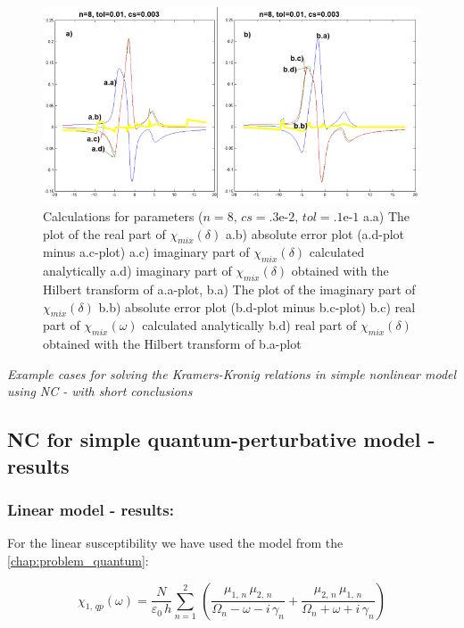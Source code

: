 \documentclass[12pt,twoside,a4paper]{article}
\numberwithin{equation}{subsection}
\numberwithin{figure}{subsection}
\begin{document}
\begin{figure} 
  \includegraphics[width=150mm]{img/nc_fmix1.png}
  \caption{Calculations for parameters ($n=8, \,cs=\mbox{.3e-2}, \,tol=\mbox{.1e-1}$
     a.a) The plot of the real part of ${\chi_{mix}}(\delta )$
     a.b) absolute error plot (a.d-plot minus a.c-plot) 
     a.c) imaginary part of ${\chi_{mix}}(\delta )$ calculated analytically 
     a.d) imaginary part of ${\chi_{mix}}(\delta )$ obtained with the Hilbert transform of a.a-plot, 
     b.a) The plot of the imaginary part of ${\chi_{mix}}(\delta )$ 
     b.b) absolute error plot (b.d-plot minus b.c-plot) 
     b.c) real part of $\chi_{mix} (\omega )$ calculated analytically 
     b.d) real part of ${\chi_{mix}}(\delta )$ obtained with the Hilbert transform of b.a-plot 
     \label{fig:nc_fmix1}
     }
\end{figure}

\textit{Example cases for solving the Kramers-Kronig relations in simple nonlinear model using NC - with short conclusions}

\subsection{NC for simple quantum-perturbative model - results} \label{chap:nc_quantum}

\subsubsection*{Linear model - results:}

For the linear susceptibility we have used the model from the \ref{chap:problem_quantum}: 

\begin{equation} \label{eq:nclin_chipp}
  {\chi_{1, \,qp}}(\omega ) = \frac {N}{\varepsilon_0\,h} \sum_{n=1}^{2}\,(\frac {{\mu_{1, \,n}}\,{ \mu_{2, \,n}}}{{\Omega_{n}}
  - \omega  - i\,{\gamma_{n}}} + \frac {{\mu_{2, \,n}}\,{\mu_{1, \,n}}}{{\Omega_{n}} + \omega + i\,{\gamma_{n}}})
\end{equation}
\end{document}
